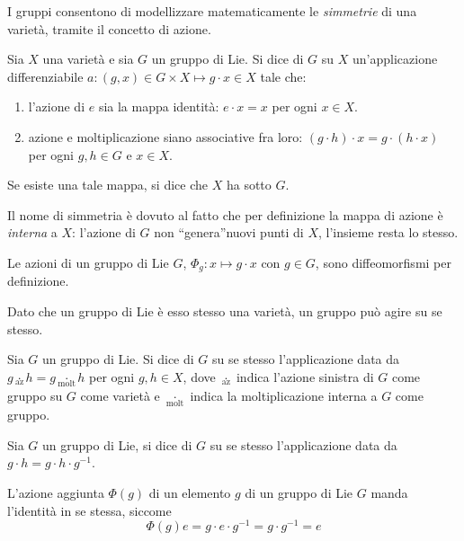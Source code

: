 I gruppi consentono di modellizzare matematicamente le \emph{simmetrie} di una varietà, tramite il concetto di azione.
\begin{definition}
  Sia $X$ una varietà e sia $G$ un gruppo di Lie. Si dice  di $G$ su $X$ un'applicazione differenziabile $a:(g,x) \in G \times X \mapsto g \cdot x \in X$ tale che:
  \begin{enumerate}
    \item l'azione di $e$ sia la mappa identità: $e \cdot x = x$ per ogni $x \in X$.
    \item azione e moltiplicazione siano associative fra loro: $(g \cdot h) \cdot x = g\cdot (h\cdot x)$ per ogni $g,h \in G$ e $x \in X$.
  \end{enumerate}
Se esiste una tale mappa, si dice che $X$ ha  sotto $G$. 
\end{definition}
\begin{remark}
  Il nome di simmetria è dovuto al fatto che per definizione la mappa di azione è \emph{interna} a $X$: l'azione di $G$ non \textquotedblleft genera\textquotedblright nuovi punti di $X$, l'insieme resta lo stesso.
\end{remark}
\begin{remark}
  Le azioni di un gruppo di Lie $G$, $\Phi_g: x \mapsto g\cdot x$ con $g \in G$, sono diffeomorfismi per definizione.
\end{remark}

Dato che un gruppo di Lie è esso stesso una varietà, un gruppo può agire su se stesso.
\begin{definition}
  Sia $G$ un gruppo di Lie. Si dice  di $G$ su se stesso l'applicazione data da $g \underset{\text{az}}{\cdot} h = g \underset{\text{molt}}{\cdot} h$ per ogni $g,h \in X$, dove $\underset{\text{az}}{\cdot}$ indica l'azione sinistra di $G$ come gruppo su $G$ come varietà e $\underset{\text{molt}}{\cdot}$ indica la moltiplicazione interna a $G$ come gruppo.
\end{definition}
\begin{definition}
  Sia $G$ un gruppo di Lie, si dice  di $G$ su se stesso l'applicazione data da $g \cdot h = g \cdot h \cdot g^{-1}$.
\end{definition}
\begin{remark} \label{rem:adjIdentity}
  L'azione aggiunta $\Phi(g)$ di un elemento $g$ di un gruppo di Lie $G$ manda l'identità in se stessa, siccome \begin{equation*}
  \Phi(g)e = g\cdot e\cdot g^{-1} = g\cdot g^{-1} = e
  \end{equation*} 
\end{remark}

